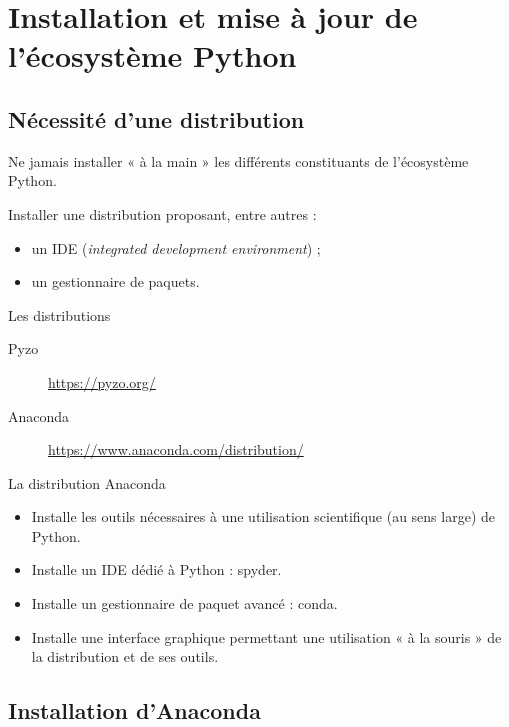 \documentclass[10pt,aspectratio=169]{beamer}
\begin{document}
\section{Installation et mise à jour de l'écosystème Python}

\subsection{Nécessité d'une distribution}

\begin{frame}
  Ne jamais installer « à la main » les différents constituants de l'écosystème Python.
  \begin{Conseil}
    Installer une \alert{distribution} proposant, entre autres :
    \begin{itemize}
    \item un \alert{IDE} (\emph{integrated development environment}) ;
    \item un \alert{gestionnaire de paquets}.
    \end{itemize}
  \end{Conseil}
\end{frame}

\begin{frame}{Les distributions}
  \begin{description}
  \item[Pyzo] \url{https://pyzo.org/}
  \item[Anaconda] \alert{\faHandPointRight[regular]}\url{https://www.anaconda.com/distribution/}\alert{\faHandPointLeft[regular]}
  \end{description}
\end{frame}

\begin{frame}{La distribution Anaconda}
  \begin{itemize}
  \item Installe les outils nécessaires à une \alert{utilisation scientifique} (au sens large) de Python.
  \item Installe un IDE dédié à Python : \alert{spyder}.
  \item Installe un gestionnaire de paquet avancé : \alert{conda}.
  \item Installe une \alert{interface graphique} permettant une utilisation « à la souris » de la distribution et de ses outils.
  \end{itemize}
\end{frame}

\subsection{Installation d'Anaconda}
\end{document}
